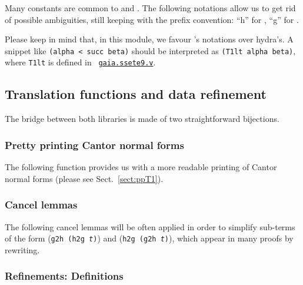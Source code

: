 
Many constants are common to \HydrasLib and \gaia. The following notations allow us to get rid of possible ambiguities, still
keeping with the prefix convention: ``h'' for \HydrasLib, ``g'' for \gaia. 


Please keep in mind that, in this module, we favour \gaia's notations over hydra's. A snippet like \texttt{(alpha < succ beta)} should be interpreted as \texttt{(T1lt alpha beta)}, where \texttt{T1lt} is defined in ~\href{https://github.com/coq-community/gaia/blob/master/theories/ssete9.v}{\texttt{gaia.ssete9.v}}.


\subsection{Translation functions and data refinement}

The bridge between both libraries is made of two straightforward bijections.


\subsubsection{Pretty printing Cantor normal forms}
\label{sect:gaia-ppT1}

The following function provides us with a more readable  printing of Cantor normal forms (please see Sect.~\vref{sect:ppT1}).



\subsubsection{Cancel lemmas}

The following cancel lemmas will be often applied in order to simplify sub-terms of the form (\texttt{g2h (h2g {\it t})}) and (\texttt{h2g (g2h {\it t})}), which appear in many proofs by rewriting.




\subsubsection{Refinements: Definitions}



